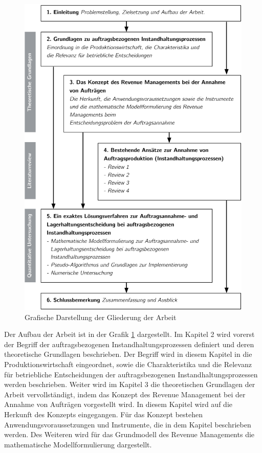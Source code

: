 \begin{figure}[h!]
  \begin{center}
    \includegraphics[width=140mm]{Bilder/Gliederung.pdf}
    \caption{Grafische Darstellung der Gliederung der Arbeit}  \label{Gliederung}
  \end{center}
\end{figure}


Der Aufbau der Arbeit ist in der Grafik \ref{Gliederung} dargestellt. Im Kapitel 2 wird vorerst der Begriff der auftragsbezogenen Instandhaltungsprozessen definiert und deren theoretische Grundlagen beschrieben. Der Begriff wird in diesem Kapitel in die Produktionswirtschaft eingeordnet, sowie die Charakteristika und die Relevanz für betriebliche Entscheidungen der auftragsbezogenen Instandhaltungsprozessen werden beschrieben. Weiter wird im Kapitel 3 die theoretischen Grundlagen der Arbeit vervollständigt, indem das Konzept des Revenue Management bei der Annahme von Aufträgen vorgestellt wird. In diesem Kapitel wird auf die Herkunft des Konzepts eingegangen. Für das Konzept bestehen Anwendungsvoraussetzungen und Instrumente, die in dem Kapitel beschrieben werden. Des Weiteren wird für das Grundmodell des Revenue Managements die mathematische Modellformulierung dargestellt.

